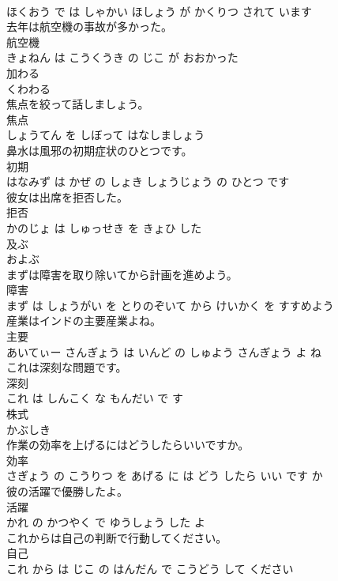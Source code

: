 \documentclass[8pt]{extreport}
\begin{document}
\begin{CJK}{UTF8}{min}
\\	ほくおう で は しゃかい ほしょう が かくりつ されて います			
\\	去年は航空機の事故が多かった。	
\\	航空機 
\\	きょねん は こうくうき の じこ が おおかった			
\\	加わる	
\\	くわわる			
\\	焦点を絞って話しましょう。	
\\	焦点 
\\	しょうてん を しぼって はなしましょう			
\\	鼻水は風邪の初期症状のひとつです。	
\\	初期 
\\	はなみず は かぜ の しょき しょうじょう の ひとつ です			
\\	彼女は出席を拒否した。	
\\	拒否 
\\	かのじょ は しゅっせき を きょひ した			
\\	及ぶ	
\\	およぶ			
\\	まずは障害を取り除いてから計画を進めよう。	
\\	障害 
\\	まず は しょうがい を とりのぞいて から けいかく を すすめよう			
\\	産業はインドの主要産業よね。	
\\	主要 
\\	あいてぃー さんぎょう は いんど の しゅよう さんぎょう よ ね			
\\	これは深刻な問題です。	
\\	深刻 
\\	これ は しんこく な もんだい で す			
\\	株式	
\\	かぶしき			
\\	作業の効率を上げるにはどうしたらいいですか。	
\\	効率 
\\	さぎょう の こうりつ を あげる に は どう したら いい です か			
\\	彼の活躍で優勝したよ。	
\\	活躍 
\\	かれ の かつやく で ゆうしょう した よ			
\\	これからは自己の判断で行動してください。	
\\	自己 
\\	これ から は じこ の はんだん で こうどう して ください			

\end{CJK}
\end{document}
